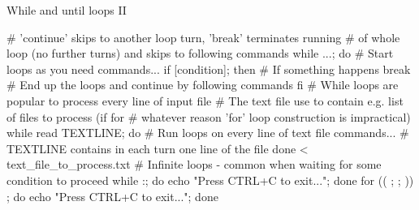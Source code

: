 \documentclass[compress, xelatex, 11pt, xcolor=svgnames, aspectratio=169,
	hyperref={
		bookmarks=true,
		unicode=true,
		colorlinks=true,
		pdftitle={Linux, command line and MetaCentrum},
		plainpages=false,
		pdfauthor={Vojtech Zeisek},
		pdfsubject={Course about use of Linux command line, writing shell scripts and using MetaCentrum of CESNET},
		pdfcreator={XeLaTeX},
		pdfkeywords={Linux, GNU, BASH, shell, command line, MetaCentrum},
		linkcolor=DarkRed, %
		anchorcolor=DarkBlue, %
		citecolor=Indigo, %
		filecolor=NavyBlue, %
		menucolor=DarkMagenta, %
		urlcolor=DarkBlue, %
		},
	url={hyphens, lowtilde} %
	]{beamer}
\begin{document}
\begin{frame}[fragile]{While and until loops II}
	\begin{bashcode}
    # 'continue' skips to another loop turn, 'break' terminates running
    # of whole loop (no further turns) and skips to following commands
    while ...; do # Start loops as you need
      commands...
      if [condition]; then # If something happens
        break # End up the loops and continue by following commands
        fi
    # While loops are popular to process every line of input file
    # The text file use to contain e.g. list of files to process (if for
    # whatever reason 'for' loop construction is impractical)
    while read TEXTLINE; do # Run loops on every line of text file
      commands... # TEXTLINE contains in each turn one line of the file
      done < text_file_to_process.txt
    # Infinite loops - common when waiting for some condition to proceed
    while :; do echo "Press CTRL+C to exit..."; done
    for (( ; ; )) ; do echo "Press CTRL+C to exit..."; done
	\end{bashcode}
\end{frame}

\subsection{}
\end{document}
